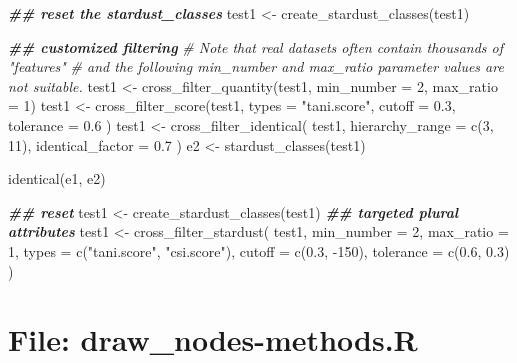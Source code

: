 \documentclass[
]{article}
\newenvironment{Shaded}{\begin{snugshade}}{\end{snugshade}}
\newcommand{\AttributeTok}[1]{\textcolor[rgb]{0.77,0.63,0.00}{#1}}
\newcommand{\CommentTok}[1]{\textcolor[rgb]{0.56,0.35,0.01}{\textit{#1}}}
\newcommand{\DecValTok}[1]{\textcolor[rgb]{0.00,0.00,0.81}{#1}}
\newcommand{\DocumentationTok}[1]{\textcolor[rgb]{0.56,0.35,0.01}{\textbf{\textit{#1}}}}
\newcommand{\FloatTok}[1]{\textcolor[rgb]{0.00,0.00,0.81}{#1}}
\newcommand{\FunctionTok}[1]{\textcolor[rgb]{0.00,0.00,0.00}{#1}}
\newcommand{\NormalTok}[1]{#1}
\newcommand{\OtherTok}[1]{\textcolor[rgb]{0.56,0.35,0.01}{#1}}
\newcommand{\SpecialCharTok}[1]{\textcolor[rgb]{0.00,0.00,0.00}{#1}}
\newcommand{\StringTok}[1]{\textcolor[rgb]{0.31,0.60,0.02}{#1}}
\begin{document}
\begin{Shaded}
\begin{Highlighting}[]
\DocumentationTok{\#\# reset the \textquotesingle{}stardust\_classes\textquotesingle{}}
\NormalTok{test1 }\OtherTok{\textless{}{-}} \FunctionTok{create\_stardust\_classes}\NormalTok{(test1)}

\DocumentationTok{\#\# customized filtering}
\CommentTok{\# Note that real datasets often contain thousands of "features"}
\CommentTok{\# and the following \textquotesingle{}min\_number\textquotesingle{} and \textquotesingle{}max\_ratio\textquotesingle{} parameter values are not suitable.}
\NormalTok{test1 }\OtherTok{\textless{}{-}} \FunctionTok{cross\_filter\_quantity}\NormalTok{(test1, }\AttributeTok{min\_number =} \DecValTok{2}\NormalTok{, }\AttributeTok{max\_ratio =} \DecValTok{1}\NormalTok{)}
\NormalTok{test1 }\OtherTok{\textless{}{-}} \FunctionTok{cross\_filter\_score}\NormalTok{(test1,}
  \AttributeTok{types =} \StringTok{"tani.score"}\NormalTok{,}
  \AttributeTok{cutoff =} \FloatTok{0.3}\NormalTok{,}
  \AttributeTok{tolerance =} \FloatTok{0.6}
\NormalTok{)}
\NormalTok{test1 }\OtherTok{\textless{}{-}} \FunctionTok{cross\_filter\_identical}\NormalTok{(}
\NormalTok{  test1,}
  \AttributeTok{hierarchy\_range =} \FunctionTok{c}\NormalTok{(}\DecValTok{3}\NormalTok{, }\DecValTok{11}\NormalTok{),}
  \AttributeTok{identical\_factor =} \FloatTok{0.7}
\NormalTok{)}
\NormalTok{e2 }\OtherTok{\textless{}{-}} \FunctionTok{stardust\_classes}\NormalTok{(test1)}

\FunctionTok{identical}\NormalTok{(e1, e2)}

\DocumentationTok{\#\# reset}
\NormalTok{test1 }\OtherTok{\textless{}{-}} \FunctionTok{create\_stardust\_classes}\NormalTok{(test1)}
\DocumentationTok{\#\# targeted plural attributes}
\NormalTok{test1 }\OtherTok{\textless{}{-}} \FunctionTok{cross\_filter\_stardust}\NormalTok{(}
\NormalTok{  test1,}
  \AttributeTok{min\_number =} \DecValTok{2}\NormalTok{,}
  \AttributeTok{max\_ratio =} \DecValTok{1}\NormalTok{,}
  \AttributeTok{types =} \FunctionTok{c}\NormalTok{(}\StringTok{"tani.score"}\NormalTok{, }\StringTok{"csi.score"}\NormalTok{),}
  \AttributeTok{cutoff =} \FunctionTok{c}\NormalTok{(}\FloatTok{0.3}\NormalTok{, }\SpecialCharTok{{-}}\DecValTok{150}\NormalTok{),}
  \AttributeTok{tolerance =} \FunctionTok{c}\NormalTok{(}\FloatTok{0.6}\NormalTok{, }\FloatTok{0.3}\NormalTok{)}
\NormalTok{)}
\end{Highlighting}
\end{Shaded}

\hypertarget{file-draw_nodes-methods.r}{%
\section{File: draw\_nodes-methods.R}\label{file-draw_nodes-methods.r}}
\end{document}
